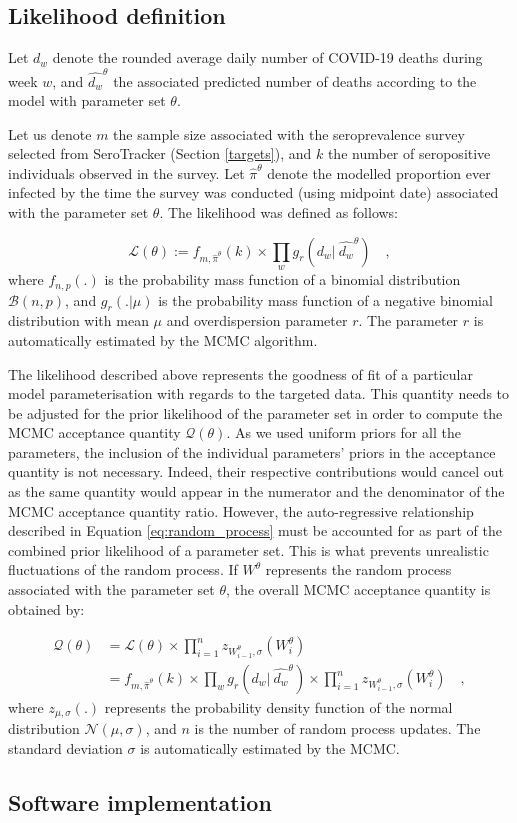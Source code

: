 \subsection{Likelihood definition}
\label{likelihood}
Let $d_w$ denote the rounded average daily number of COVID-19 deaths during week $w$, and $\hat{d_w}^\theta$ 
the associated predicted number of deaths according to the model with parameter set $\theta$. 

Let us denote $m$ the sample size associated with the seroprevalence survey selected from SeroTracker (Section \ref{targets}), 
and $k$ the number of seropositive individuals observed in the survey.
Let $\hat{\pi}^\theta$ denote the modelled proportion ever infected by the time the survey was conducted (using midpoint date) 
associated with the parameter set $\theta$. 
The likelihood was defined as follows:

\begin{equation}
    \label{eq:likelihood}
    \mathcal{L}(\theta) := f_{m,\hat{\pi}^\theta}(k) \times \prod_w g_r(d_w | \:\hat{d_w}^\theta) \quad ,
\end{equation}
where $f_{n,p}(.)$ is the probability mass function of a binomial distribution $\mathcal{B}(n,p)$, and 
$g_r(. | \mu)$ is the probability mass function of a negative binomial distribution with mean $\mu$ and 
overdispersion parameter $r$. The parameter $r$ is automatically estimated by the MCMC algorithm.

The likelihood described above represents the goodness of fit of a particular model parameterisation with regards to the targeted data. 
This quantity needs to be adjusted for the prior likelihood of the parameter set in order to compute the MCMC acceptance quantity $\mathcal{Q}(\theta)$.
As we used uniform priors for all the parameters, the inclusion of the individual parameters' priors in the acceptance quantity is not necessary. 
Indeed, their respective contributions would cancel out as the same quantity would appear in the numerator and the denominator of the 
MCMC acceptance quantity ratio. However, the auto-regressive relationship described in Equation \ref{eq:random_process}
must be accounted for as part of the combined prior likelihood of a parameter set. This is what prevents unrealistic fluctuations of the random process.
If $W^\theta$ represents the random process associated with the parameter set $\theta$, the overall MCMC acceptance quantity is obtained by:

\begin{equation}
    \label{eq:acc_qtt}
    \begin{split}
    \mathcal{Q}(\theta) & = \mathcal{L}(\theta) \times \prod_{i=1}^{n} z_{W^\theta_{i-1},\sigma}(W^\theta_i) \\
                        & = f_{m,\hat{\pi}^\theta}(k) \times \prod_w g_r(d_w | \:\hat{d_w}^\theta) \times \prod_{i=1}^{n} z_{W^\theta_{i-1},\sigma}(W^\theta_i) \quad ,
    \end{split}
\end{equation}
where $z_{\mu,\sigma}(.)$ represents the probability density function of the normal distribution $\mathcal{N}(\mu, \sigma)$, and $n$ is the number 
of random process updates. The standard deviation $\sigma$ is automatically estimated by the MCMC.

\subsection{Software implementation}


